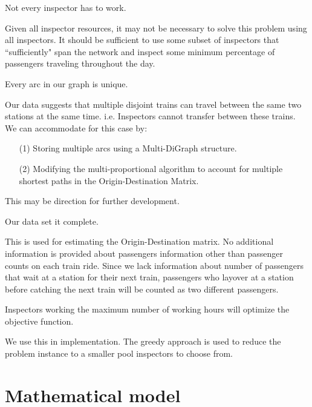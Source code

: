 \documentclass[11pt]{article}
\begin{document}
\begin{assump}
Not every inspector has to work.
\end{assump}
Given all inspector resources, it may not be necessary to solve this problem using all inspectors. It should be sufficient to use some subset of inspectors that ``sufficiently" span the network and inspect some minimum percentage of passengers traveling throughout the day.
\begin{assump}
    Every arc in our graph is unique.
\end{assump}
Our data suggests that multiple disjoint trains can travel between the same two stations at the same time. i.e. Inspectors cannot transfer between these trains. We can accommodate for this case by:
        \begin{itemize}
            \item[(1)] Storing multiple arcs using a Multi-DiGraph structure.
            \item[(2)] Modifying the multi-proportional algorithm to account for multiple shortest paths in the Origin-Destination Matrix. 
        \end{itemize}
         This may be direction for further development.
\begin{assump}
    Our data set it complete.
\end{assump}
This is used for estimating the Origin-Destination matrix. No additional information is provided about passengers information other than passenger counts on each train ride. Since we lack information about number of passengers that wait at a station for their next train, passengers who layover at a station before catching the next train will be counted as two different passengers.

\begin{assump}
     Inspectors working the maximum number of working hours will optimize the objective function.
\end{assump}
We use this in implementation. 
The greedy approach is used to reduce the problem instance to a smaller pool inspectors to choose from. 


\section{Mathematical model}
\end{document}
